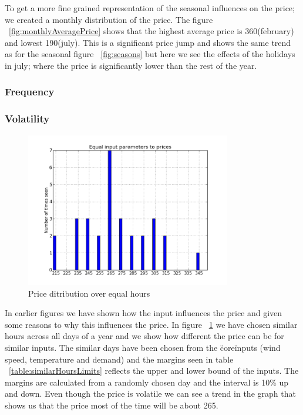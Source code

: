 To get a more fine grained representation of the seasonal influences on the price; we created a monthly distribution of the price. The figure ~\ref{fig:monthlyAveragePrice} shows that the highest average price is 360(february) and lowest 190(july). This is a significant price jump and shows the same trend as for the seasonal figure ~\ref{fig:seasons} but here we see the effects of the holidays in july; where the price is significantly lower than the rest of the year.

\subsubsection{Frequency}

\subsubsection{Volatility}

\begin{figure}[H]
\centering
\includegraphics[width=0.8\textwidth ,natwidth=410,natheight=237]{billeder/energy_price_plots/same_hour_distribution.png}
\caption{Price ditribution over equal hours}
\label{fig:same_hour_distribution}
\end{figure}

In earlier figures we have shown how the input influences the price and given some reasons to why this influences the price. In figure ~\ref{fig:same_hour_distribution} we have chosen similar hours across all days of a year and we show how different the price can be for similar inputs. The similar days have been chosen from the \"core\" inputs (wind speed, temperature and demand) and the margins seen in table ~\ref{table:similarHoursLimits} reflects the upper and lower bound of the inputs. The margins are calculated from a randomly chosen day and the interval is 10\% up and down. Even though the price is volatile we can see a trend in the graph that shows us that the price most of the time will be about 265.

